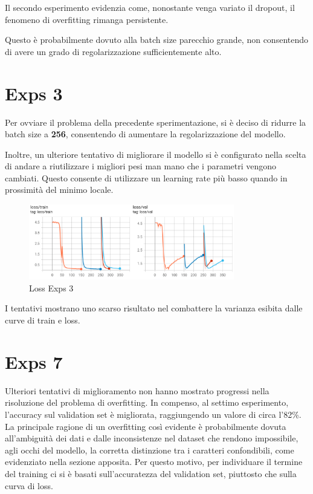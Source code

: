 Il secondo esperimento evidenzia come, nonostante venga variato il dropout, il fenomeno di overfitting rimanga persistente.

Questo è probabilmente dovuto alla batch size parecchio grande, non consentendo di avere un grado di regolarizzazione sufficientemente alto.


\section{Exps 3}

Per ovviare il problema della precedente sperimentazione, si è deciso di ridurre la batch size a \textbf{256}, consentendo di aumentare la regolarizzazione del modello.

Inoltre, un ulteriore tentativo di migliorare il modello si è configurato nella scelta di andare a riutilizzare i migliori pesi man mano che i parametri vengono cambiati. Questo consente di utilizzare un learning rate più basso quando in prossimità del minimo locale.

\begin{figure}[htbp]
    \centering
    \includegraphics[width=0.8\textwidth]{images/exps3_loss.png}
    \caption{Loss Exps 3}
    \label{fig:exps1_loss}
\end{figure}

I tentativi mostrano uno scarso risultato nel combattere la varianza esibita dalle curve di train e loss.


\section{Exps 7}

Ulteriori tentativi di miglioramento non hanno mostrato progressi nella risoluzione del problema di overfitting. In compenso, al settimo esperimento, l'accuracy sul validation set è migliorata, raggiungendo un valore di circa l'82\%.
La principale ragione di un overfitting così evidente è probabilmente dovuta all'ambiguità dei dati e dalle inconsistenze nel dataset che rendono impossibile, agli occhi del modello, la corretta distinzione tra i caratteri confondibili, come evidenziato nella sezione apposita. Per questo motivo, per individuare il termine del training ci si è basati sull'accuratezza del validation set, piuttosto che sulla curva di loss.


